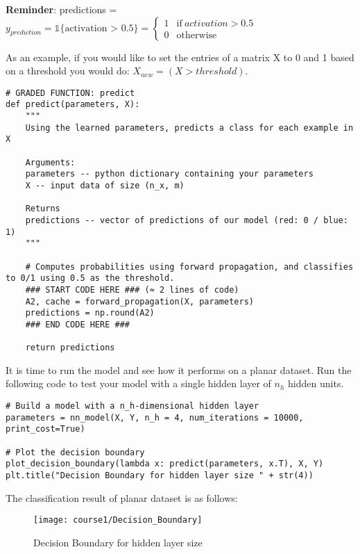 {\textbf {Reminder}}: predictions = $y_{prediction} = \mathbb 1 \text{\{activation > 0.5\}} = \begin{cases}
      1 & \text{if}\ activation > 0.5 \\
      0 & \text{otherwise}
    \end{cases}$  
    
As an example, if you would like to set the entries of a matrix X to 0 and 1 based on a threshold you would do:\emph{ $X_{new} = (X > threshold)$}.


\begin{verbatim}
# GRADED FUNCTION: predict
def predict(parameters, X):
    """
    Using the learned parameters, predicts a class for each example in X
    
    Arguments:
    parameters -- python dictionary containing your parameters 
    X -- input data of size (n_x, m)
    
    Returns
    predictions -- vector of predictions of our model (red: 0 / blue: 1)
    """
    
    # Computes probabilities using forward propagation, and classifies to 0/1 using 0.5 as the threshold.
    ### START CODE HERE ### (≈ 2 lines of code)
    A2, cache = forward_propagation(X, parameters)
    predictions = np.round(A2)
    ### END CODE HERE ###
    
    return predictions
\end{verbatim}


It is time to run the model and see how it performs on a planar dataset. Run the following code to test your model with a single hidden layer of  $n_h$  hidden units.

\begin{verbatim}
# Build a model with a n_h-dimensional hidden layer
parameters = nn_model(X, Y, n_h = 4, num_iterations = 10000, print_cost=True)

# Plot the decision boundary
plot_decision_boundary(lambda x: predict(parameters, x.T), X, Y)
plt.title("Decision Boundary for hidden layer size " + str(4))
\end{verbatim}

The classification result of planar dataset is as follows:

\begin{figure}[h]
\begin{center}
\texttt{[image: course1/Decision\_Boundary]}
\end{center}
\caption{Decision Boundary for hidden layer size}
\label{fig:Decision_Boundary}
\end{figure}

